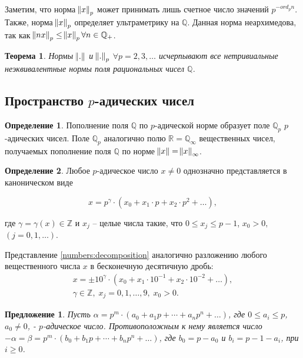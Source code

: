 \documentclass[master, och, diploma, times]{sty/SCWorks}
\theoremstyle{plain}
\newtheorem{thethm}{Теорема}[section]
\newtheorem{proposition}{Предложение}[section]
\theoremstyle{definition}
\newtheorem{defn}{Определение}[section]
\numberwithin{equation}{section}
\begin{document}
Заметим, что норма $\norm{x}_p$ может принимать лишь счетное число значений $p ^ {-ord_pn}$. Также, норма $\norm{x}_p$ определяет ультраметрику на $\mathbb {Q}$. Данная норма неархимедова, так как $\norm{nx}_p \le \norm{x}_p \forall n \in \mathbb {Q}_{+}$.

\begin{thethm}
	Нормы $\norm{.}$ и $\norm{.}_p$ $\forall p = 2, 3, \dots$ исчерпывают все нетривиальные неэквивалентные нормы поля рациональных чисел $\mathbb {Q}$.
\end{thethm}


\subsection{Пространство $p$-адических чисел}

\begin{defn}
Пополнение поля $\mathbb {Q}$ по $p$-адической норме образует поле $\mathbb {Q}_p$ $p$-адических чисел. Поле $\mathbb {Q}_p$ аналогично полю $\mathbb {R} = \mathbb {Q}_{\infty}$ вещественных чисел, получаемых пополнение поля $\mathbb {Q}$ по норме $\norm{x}=\norm{x}_{\infty}$.
\end{defn}


\begin{defn}
Любое $p$-адическое число $x \ne 0$ однозначно представляется в каноническом виде

\begin{equation} \label{numbers:decomposition}
	x = p^{\gamma} \cdot (x_0 + x_1\cdot p + x_2 \cdot p^2 + \dots),
\end{equation}

\noindent где $\gamma = \gamma(x) \in \mathbb {Z}$ и $x_j$ -- целые числа такие, что $0 \le x_j \le p-1$, $x_0 > 0,$ \linebreak $(j=0,1,\dots)$. 
\end{defn}

Представление \eqref{numbers:decomposition} аналогично разложению любого вещественного числа $x$ в бесконечную десятичную дробь:
\begin{equation}
\begin{aligned}
	x=\pm10^\gamma \cdot (x_0 + x_1 \cdot 10^{-1} + x_2 \cdot 10^{-2} + \dots),\\
	\gamma \in \mathbb {Z}, \; x_j = 0, 1, \dots, 9, \; x_0 > 0.
\end{aligned}
\end{equation}

\begin{proposition}
Пусть $\alpha=p^m \cdot (a_0+a_1p+\cdots +a_np^n+\dots)$, где $0 \le a_i \le p$, $a_0 \neq 0$, - $p$-адическое число. Противоположным к нему является число \mbox{$- \alpha=\beta=p^m \cdot (b_0+b_1p+\cdots+b_np^n+\dots)$}, где $b_0=p-a_0$ и $b_i=p-1-a_i$, при $i \geq 0$.
\end{proposition}\label{adic:pros:minus}
\end{document}
